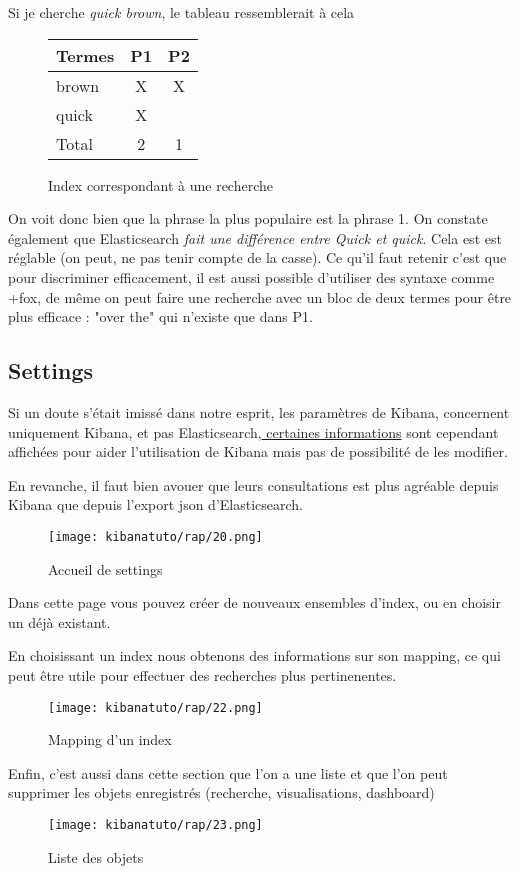 Si je cherche \emph{quick brown}, le tableau ressemblerait à cela 


\begin{figure}[H]
\center
\begin{tabular}{|l||c|c|}
\hline
\textbf{Termes}   & \textbf{P1}    & \textbf{P2}\\ \hline  
brown   &   X   &  X\\ \hline
quick   &   X   &   \\ \hline \hline
Total   &   2   &  1 \\ \hline
\end{tabular}
\caption{Index correspondant à une recherche}
\end{figure}

On voit donc bien que la phrase la plus populaire est la phrase 1. On constate également
que Elasticsearch \emph{fait une différence entre \emph{Quick} et \emph{quick}}. 
Cela est est réglable (on peut, ne pas tenir compte de la casse).
Ce qu'il faut retenir c'est que pour discriminer efficacement, il est aussi possible
d'utiliser des syntaxe comme +fox, de même on peut faire une recherche avec un bloc
de deux termes pour être plus efficace : "over the" qui n'existe que dans P1.

\subsection{Settings}
\label{subsec:settings}
Si un doute s'était imissé dans notre esprit, les paramètres de Kibana, concernent
uniquement Kibana, et pas Elasticsearch,\hyperref[fig:kibanatuto14]{ certaines informations} 
sont cependant affichées pour aider l'utilisation de Kibana mais pas de possibilité 
de les modifier.

En revanche, il faut bien avouer que leurs consultations est plus agréable depuis 
Kibana que depuis l'export json d'Elasticsearch.

\begin{figure}[H]
\center
\texttt{[image: kibanatuto/rap/20.png]}
\label{fig:kibanatuto13}
\caption{Accueil de settings}
\end{figure}

Dans cette page vous pouvez créer de nouveaux ensembles d'index, ou en choisir un 
déjà existant.

En choisissant un index nous obtenons des informations sur son mapping, ce qui peut 
être utile pour effectuer des recherches plus pertinenentes.


\begin{figure}[H]
\center
\texttt{[image: kibanatuto/rap/22.png]}
\label{fig:kibanatuto14}
\caption{Mapping d'un index}
\end{figure}

Enfin, c'est aussi dans cette section que l'on a une liste et que l'on peut supprimer les 
objets enregistrés (recherche, visualisations, dashboard)

\begin{figure}[H]
\center
\texttt{[image: kibanatuto/rap/23.png]}
\label{fig:kibanatuto15}
\caption{Liste des objets}
\end{figure}

